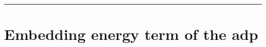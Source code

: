 \documentclass{article}
\begin{document}
\begin{comment}
This is the hessian
\begin{equation}
\begin{split}
\text{D}_{\gls{distance-vec}} \text{D}_{\gls{distance-vec}}\bar{\gls{energy-density}}_{i}\ &=\  \sum_{\substack{j \in \mathcal{B}_i(r_\text{c}) \\ j \neq i}} \gls{molar-fraction}_j\ \frac{d^2 \gls{energy-density}\ (\| \gls{distance-vec}_{ij} \|)}{d \| \gls{distance-vec}_{ij} \|^2}\ \left(\frac{d \| \gls{distance-vec}_{ij} \| }{d \gls{distance-vec}_{ij}} \otimes \frac{d \| \gls{distance-vec}_{ij} \| }{d \gls{distance-vec}_{ij}}\right)\ +\ \gls{molar-fraction}_j\ \frac{d \gls{energy-density}\ (\| \gls{distance-vec}_{ij} \|)}{d \| \gls{distance-vec}_{ij} \|}\ \frac{d^2 \| \gls{distance-vec}_{ij} \| }{d \gls{distance-vec}_{ij} d \gls{distance-vec}_{ij}}\ \\
&=\ \sum_{\substack{j \in I_{Mg}\ \\ j \neq i}} \frac{d^2 \gls{energy-density}\ (\| \gls{distance-vec}_{ij} \|)}{d \| \gls{distance-vec}_{ij} \|^2}\ \left(\frac{\gls{distance-vec}_{ij}}{\| \gls{distance-vec}_{ij} \|} \otimes \frac{\gls{distance-vec}_{ij}}{\| \gls{distance-vec}_{ij} \|}\right)\ +\  \frac{d \gls{energy-density}\ (\| \gls{distance-vec}_{ij} \|)}{d \| \gls{distance-vec}_{ij} \|}\ \frac{d^2 \| \gls{distance-vec}_{ij} \| }{d \gls{distance-vec}_{ij} d \gls{distance-vec}_{ij}}\ \\
&+\ \sum_{\substack{j \in I_{H}\ \\ j \neq i}} \gls{molar-fraction}_j\ \frac{d^2 \gls{energy-density}\ (\| \gls{distance-vec}_{ij} \|)}{d \| \gls{distance-vec}_{ij} \|^2}\ \left(\frac{\gls{distance-vec}_{ij}}{\| \gls{distance-vec}_{ij} \|} \otimes \frac{\gls{distance-vec}_{ij}}{\| \gls{distance-vec}_{ij} \|}\right)\ +\ \gls{molar-fraction}_j\ \frac{d \gls{energy-density}\ (\| \gls{distance-vec}_{ij} \|)}{d \| \gls{distance-vec}_{ij} \|}\ \frac{d^2 \| \gls{distance-vec}_{ij} \| }{d \gls{distance-vec}_{ij} d \gls{distance-vec}_{ij}}\    
\end{split}
\end{equation}
\end{comment}


\vspace{0.5cm}
\hrule
\vspace{0.5cm}

\section{Embedding energy term of the \acrshort{adp}}
\end{document}
